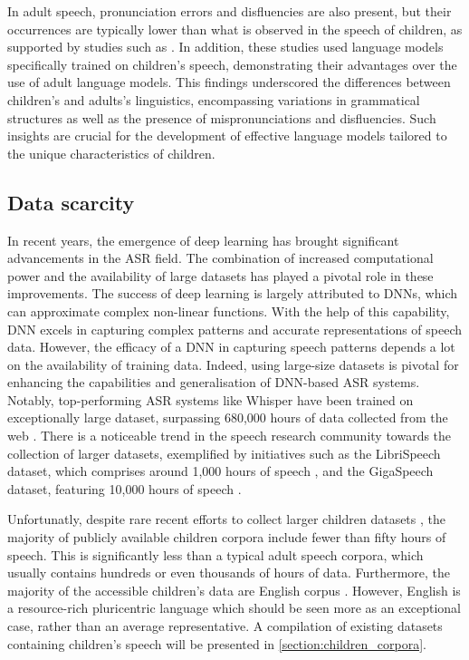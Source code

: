 In adult speech, pronunciation errors and disfluencies are also present, but their occurrences are typically lower than what is observed in the speech of children, as supported by studies such as \cite{Children_language_model,children_language_model2}. In addition, these studies used language models specifically trained on children's speech, demonstrating their advantages over the use of adult language models. This findings underscored the differences between children's and adults's linguistics, encompassing variations in grammatical structures as well as the presence of mispronunciations and disfluencies. Such insights are crucial for the development of effective language models tailored to the unique characteristics of children.


\subsection{Data scarcity}%
\label{section:data_scarcity}
In recent years, the emergence of deep learning has brought significant advancements in the \ac{ASR} field. The combination of increased computational power and the availability of large datasets has played a pivotal role in these improvements. The success of deep learning is largely attributed to \ac{DNN}s, which can approximate complex non-linear functions. With the help of this capability, \ac{DNN} excels in capturing complex patterns and accurate representations of speech data. However, the efficacy of a \ac{DNN} in capturing speech patterns depends a lot on the availability of training data. Indeed, using large-size datasets is pivotal for enhancing the capabilities and generalisation of \ac{DNN}-based \ac{ASR} systems. Notably, top-performing \ac{ASR} systems like Whisper have been trained on  exceptionally large dataset, surpassing 680,000 hours of data collected from the web \cite{radford2023robust}. There is a noticeable trend in the speech research community towards the collection of larger datasets, exemplified by initiatives such as the LibriSpeech dataset, which comprises around 1,000 hours of speech \cite{librispeech}, and the GigaSpeech dataset, featuring 10,000 hours of speech \cite{chen2021gigaspeech}.

Unfortunatly, despite rare recent efforts to collect larger children datasets \cite{MyST,singakids,ahmed2021auskidtalk}, the majority of publicly available children corpora include fewer than fifty hours of speech. This is significantly less than a typical adult speech corpora, which usually contains hundreds or even thousands of hours of data. Furthermore, the majority of the accessible children's data are English corpus \cite{MyST,cmu,cslu,pf-star-british,ahmed2021auskidtalk}. However, English is a resource-rich pluricentric language which should be seen more as an exceptional case, rather than an average representative. A compilation of existing datasets containing children's speech will be presented in \ref{section:children_corpora}.


